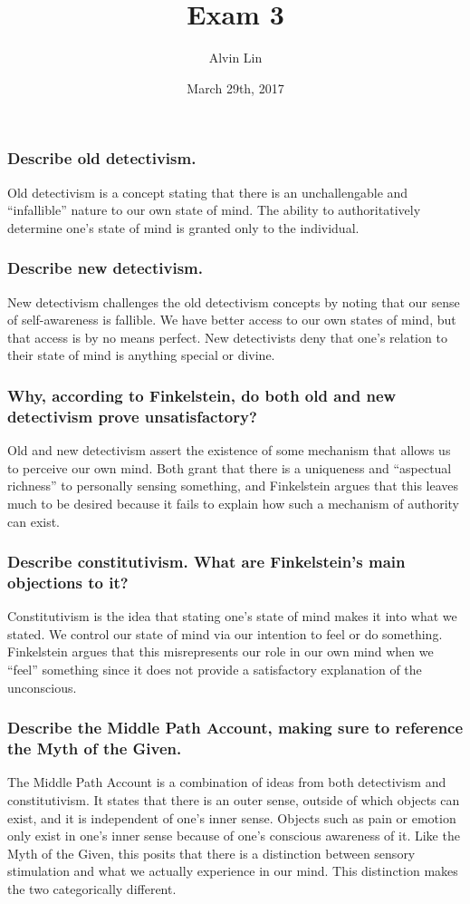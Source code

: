 \documentclass{article}
\title{Exam 3}
\author{Alvin Lin}
\date{March 29th, 2017}
\begin{document}
\maketitle

\subsubsection*{Describe old detectivism.}
Old detectivism is a concept stating that there is an unchallengable and
``infallible'' nature to our own state of mind. The ability to
authoritatively determine one's state of mind is granted only to the
individual.

\subsubsection*{Describe new detectivism.}
New detectivism challenges the old detectivism concepts by noting that our
sense of self-awareness is fallible. We have better access to our own states
of mind, but that access is by no means perfect. New detectivists deny that
one's relation to their state of mind is anything special or divine.

\subsubsection*{Why, according to Finkelstein, do both old and new detectivism
prove unsatisfactory?}
Old and new detectivism assert the existence of some mechanism that allows us
to perceive our own mind. Both grant that there is a uniqueness and
``aspectual richness'' to personally sensing something, and Finkelstein
argues that this leaves much to be desired because it fails to explain how such
a mechanism of authority can exist.

\subsubsection*{Describe constitutivism. What are Finkelstein’s main objections
to it?}
Constitutivism is the idea that stating one's state of mind makes it into what
we stated. We control our state of mind via our intention to feel or do
something. Finkelstein argues that this misrepresents our role in our own mind
when we ``feel'' something since it does not provide a satisfactory explanation
of the unconscious.

\subsubsection*{Describe the Middle Path Account, making sure to reference the
Myth of the Given.}
The Middle Path Account is a combination of ideas from both detectivism and
constitutivism. It states that there is an outer sense, outside of which
objects can exist, and it is independent of one's inner sense. Objects such
as pain or emotion only exist in one's inner sense because of one's conscious
awareness of it. Like the Myth of the Given, this posits that there is a
distinction between sensory stimulation and what we actually experience in
our mind. This distinction makes the two categorically different.
\end{document}
